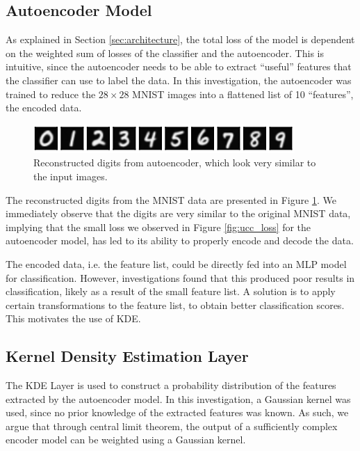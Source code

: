 \documentclass{article} %
\begin{document}
\subsection{Autoencoder Model} %
As explained in Section \ref{sec:architecture}, the total loss of the model is dependent on the weighted sum of losses of the classifier and the autoencoder. This is intuitive, since the autoencoder needs to be able to extract ``useful'' features that the classifier can use to label the data. In this investigation, the autoencoder was trained to reduce the $28\times28$ MNIST images into a flattened list of 10 ``features'', the encoded data.

\begin{figure}[htbp]
    \centering
    \includegraphics[scale=1]{images/digits.pdf}
    \caption{Reconstructed digits from autoencoder, which look very similar to the input images.}
    \label{fig:digits}
\end{figure}

The reconstructed digits from the MNIST data are presented in Figure \ref{fig:digits}. We immediately observe that the digits are very similar to the original MNIST data, implying that the small loss we observed in Figure \ref{fig:ucc_loss} for the autoencoder model, has led to its ability to properly encode and decode the data.

The encoded data, i.e. the feature list, could be directly fed into an MLP model for classification. However, investigations found that this produced poor results in classification, likely as a result of the small feature list. A solution is to apply certain transformations to the feature list, to obtain better classification scores. This motivates the use of KDE.

\subsection{Kernel Density Estimation Layer} %

The KDE Layer is used to construct a probability distribution of the features extracted by the autoencoder model. In this investigation, a Gaussian kernel was used, since no prior knowledge of the extracted features was known. As such, we argue that through central limit theorem, the output of a sufficiently complex encoder model can be weighted using a Gaussian kernel. 
\end{document}
